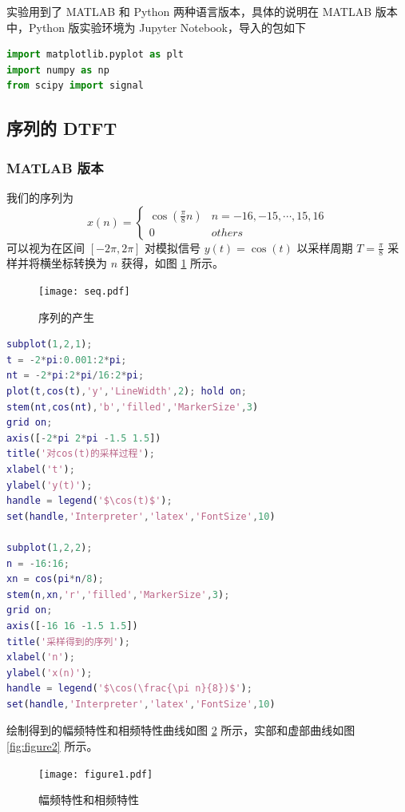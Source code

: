 \documentclass[12pt,AutoFakeBold]{article}
\begin{document}
实验用到了 MATLAB 和 Python 两种语言版本，具体的说明在 MATLAB 版本中，Python 版实验环境为 Jupyter Notebook，导入的包如下

\begin{lstlisting}[language=Python]
import matplotlib.pyplot as plt
import numpy as np
from scipy import signal
\end{lstlisting}

\subsection{序列的 DTFT}

\subsubsection{MATLAB 版本} \label{sec:matlab1}

我们的序列为
%
\begin{equation*}
x(n)=\begin{cases}\cos(\frac{\pi}{8}n) & n=-16,-15,\cdots,15,16\\
0& others\end{cases}
\end{equation*}
%
可以视为在区间 $[-2\pi, 2\pi]$ 对模拟信号 $y(t)=\cos(t)$ 以采样周期 $T=\frac{\pi}{8}$ 采样并将横坐标转换为 $n$ 获得，如图 \ref{fig:seq} 所示。

\begin{figure}[hbtp]
	\centering
	\texttt{[image: seq.pdf]}
	\caption{序列的产生}\label{fig:seq}
\end{figure}

\begin{lstlisting}[language=Matlab]
subplot(1,2,1);
t = -2*pi:0.001:2*pi;
nt = -2*pi:2*pi/16:2*pi;
plot(t,cos(t),'y','LineWidth',2); hold on;
stem(nt,cos(nt),'b','filled','MarkerSize',3)
grid on;
axis([-2*pi 2*pi -1.5 1.5])
title('对cos(t)的采样过程');
xlabel('t');
ylabel('y(t)');
handle = legend('$\cos(t)$');
set(handle,'Interpreter','latex','FontSize',10)

subplot(1,2,2);
n = -16:16;
xn = cos(pi*n/8);
stem(n,xn,'r','filled','MarkerSize',3);
grid on;
axis([-16 16 -1.5 1.5])
title('采样得到的序列');
xlabel('n');
ylabel('x(n)');
handle = legend('$\cos(\frac{\pi n}{8})$');
set(handle,'Interpreter','latex','FontSize',10)
\end{lstlisting}

绘制得到的幅频特性和相频特性曲线如图 \ref{fig:figure1} 所示，实部和虚部曲线如图 \ref{fig:figure2} 所示。

\begin{figure}[hbtp]
	\centering
	\texttt{[image: figure1.pdf]}
	\caption{幅频特性和相频特性}\label{fig:figure1}
\end{figure}
\end{document}
